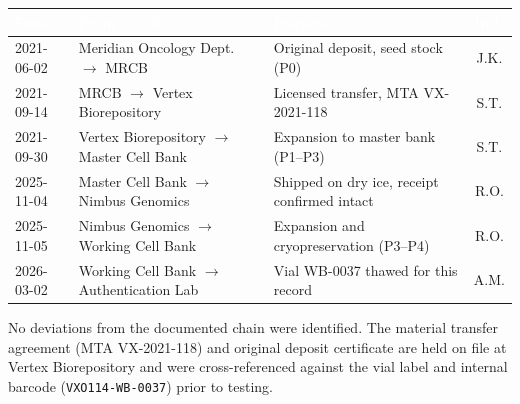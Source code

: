 \begin{table}[h!]
  \centering
  \renewcommand{\arraystretch}{1.3}
  \begin{tabularx}{\textwidth}{@{} l l X c @{}}
    \toprule
    \rowcolor{labnavy}
    \textcolor{white}{\textbf{Date}} & \textcolor{white}{\textbf{From $\rightarrow$ To}} &
    \textcolor{white}{\textbf{Purpose}} & \textcolor{white}{\textbf{Init.}} \\
    \midrule
    2021-06-02 & Meridian Oncology Dept.\ $\rightarrow$ MRCB & Original deposit, seed stock (P0) & J.K. \\
    2021-09-14 & MRCB $\rightarrow$ Vertex Biorepository & Licensed transfer, MTA VX-2021-118 & S.T. \\
    2021-09-30 & Vertex Biorepository $\rightarrow$ Master Cell Bank & Expansion to master bank (P1--P3) & S.T. \\
    2025-11-04 & Master Cell Bank $\rightarrow$ Nimbus Genomics & Shipped on dry ice, receipt confirmed intact & R.O. \\
    2025-11-05 & Nimbus Genomics $\rightarrow$ Working Cell Bank & Expansion and cryopreservation (P3--P4) & R.O. \\
    2026-03-02 & Working Cell Bank $\rightarrow$ Authentication Lab & Vial WB-0037 thawed for this record & A.M. \\
    \bottomrule
  \end{tabularx}
\end{table}

No deviations from the documented chain were identified. The material transfer agreement
(MTA VX-2021-118) and original deposit certificate are held on file at Vertex Biorepository
and were cross-referenced against the vial label and internal barcode
(\texttt{VXO114-WB-0037}) prior to testing.
